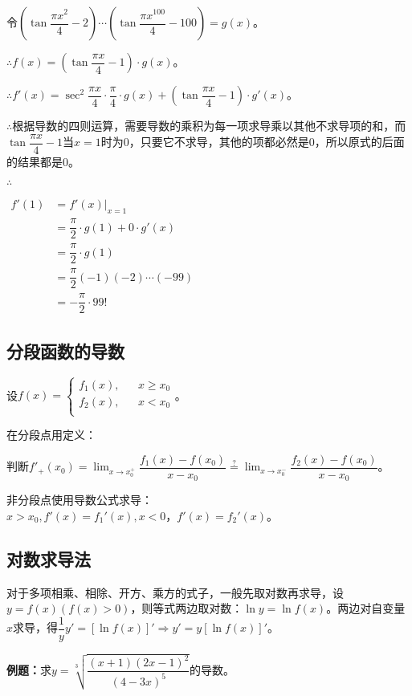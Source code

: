 \documentclass[UTF8, 12pt]{ctexart}
\begin{document}
令$\left(\tan\dfrac{\pi x^2}{4}-2\right)\cdots\left(\tan\dfrac{\pi x^100}{4}-100\right)=g(x)$。

$\therefore f(x)=\left(\tan\dfrac{\pi x}{4}-1\right)\cdot g(x)$。

$\therefore f'(x)=\sec^2\dfrac{\pi x}{4}\cdot\dfrac{\pi}{4}\cdot g(x)+\left(\tan\dfrac{\pi x}{4}-1\right)\cdot g'(x)$。

$\therefore$根据导数的四则运算，需要导数的乘积为每一项求导乘以其他不求导项的和，而$\tan\dfrac{\pi x}{4}-1$当$x=1$时为0，只要它不求导，其他的项都必然是0，所以原式的后面的结果都是0。

$\therefore$

$
\begin{aligned}
    f'(1) & =f'(x)\vert_{x=1} \\
    & =\dfrac{\pi}{2}\cdot g(1)+0\cdot g'(x) \\
    & =\dfrac{\pi}{2}\cdot g(1) \\
    & =\dfrac{\pi}{2}(-1)(-2)\cdots(-99) \\
    & =-\dfrac{\pi}{2}\cdot 99!
\end{aligned}
$

\subsection{分段函数的导数}

设$f(x)=\left\{
    \begin{array}{lcl}
        f_1(x), & & x\geqslant x_0 \\
        f_2(x), & & x<x_0 \\
    \end{array}
\right.$。

在分段点用定义：

判断$f'_+(x_0)=\lim_{x\to x_0^+}\dfrac{f_1(x)-f(x_0)}{x-x_0}\overset{?}{=}\lim_{x\to x_0^-}\dfrac{f_2(x)-f(x_0)}{x-x_0}$。

非分段点使用导数公式求导：$x>x_0,f'(x)=f_1'(x),x<0，f'(x)=f_2'(x)$。

\subsection{对数求导法}

对于多项相乘、相除、开方、乘方的式子，一般先取对数再求导，设$y=f(x)(f(x)>0)$，则等式两边取对数：$\ln y=\ln f(x)$。两边对自变量$x$求导，得$\dfrac{1}{y}y'=[\ln f(x)]'\Rightarrow y'=y[\ln f(x)]'$。

\textbf{例题：}求$y=\sqrt[3]{\dfrac{(x+1)(2x-1)^2}{(4-3x)^5}}$的导数。
\end{document}
